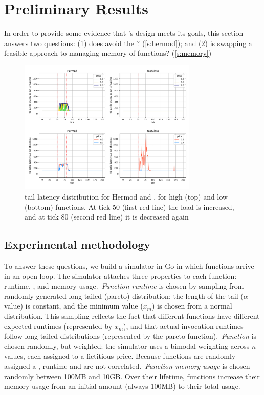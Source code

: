 \section{Preliminary Results}
\label{s:eval}

In order to provide some evidence that \sys{}'s design meets its goals,
this section answers two questions: (1) does \sys{} avoid the \problem?
(\autoref{s:hermod}); and (2) is swapping a feasible approach to
managing memory of functions? (\autoref{s:memory})

\begin{figure}[t!]
    \centering
      \includegraphics[width=8.5cm]{img/hermod_xx_latencies.png}
      \caption{ tail latency distribution for Hermod and \sys{}, for high (top)
      and low (bottom) \priceclass{} functions. At tick 50 (first red line) the
      load is increased, and at tick 80 (second red line) it is decreased again
      }
    \label{fig:hermod-xx-latencies}
\end{figure}


\subsection{Experimental methodology}

To answer these questions, we build a simulator in Go\cite{golang} in
which functions arrive in an open loop. The simulator attaches three
properties to each function: runtime, \priceclass{}, and memory
usage.~\textit{Function runtime} is chosen by sampling from randomly
generated long tailed (pareto) distribution: the length of the tail
($\alpha$ value) is constant, and the minimum value ($x_m$) is chosen
from a normal distribution. This sampling reflects the fact that
different functions have different expected runtimes (represented by
$x_m$), and that actual invocation runtimes follow long tailed
distributions (represented by the pareto function).~\textit{Function
  \class{}} is chosen randomly, but weighted: the simulator uses a
bimodal weighting across $n$ \priceclass{} values, each assigned to a
fictitious price. Because functions are randomly assigned a \class{},
runtime and \class{} are not correlated.~\textit{Function memory
  usage} is chosen randomly between 100MB and 10GB. Over their
lifetime, functions increase their memory usage from an initial amount
(always 100MB) to their total usage.

